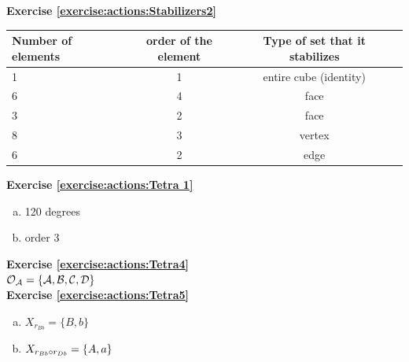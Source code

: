 \noindent\textbf{Exercise \ref{exercise:actions:Stabilizers2}}
\begin{center}
\begin{tabular}{ |l |c|c| r |}\hline
  Number of elements & order of the element & Type of set that it stabilizes \\ \hline
  1 & 1 & entire cube (identity) \\ \hline
  6 & 4 & face \\ \hline
 3 & 2 & face \\ \hline
8 & 3& vertex \\ \hline
6& 2 & edge \\ \hline
\end{tabular}
\end{center}

\noindent\textbf{Exercise \ref{exercise:actions:Tetra 1}}
\begin{enumerate}[(a)]
\item 
120 degrees
\item 
order 3
\end{enumerate}

\noindent\textbf{Exercise \ref{exercise:actions:Tetra4}}
\\
$ \cal{O}_A =\{A,B,C,D\}$
\\

\noindent\textbf{Exercise \ref{exercise:actions:Tetra5}}
\begin{enumerate}[(a)]
\item
$X_{r_{Bb}}=\{B,b\}$

\item 
$X_{ r_{Bb}\circ r_{Db }}=\{A,a\}$

\end{enumerate}

